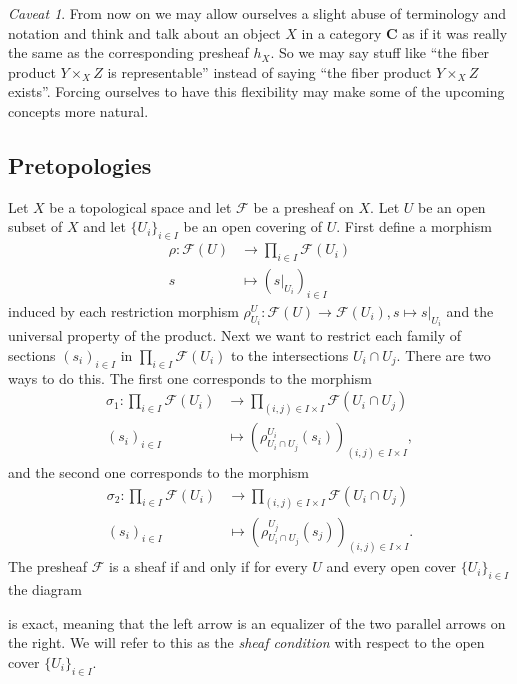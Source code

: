 \documentclass[12pt,reqno,a4paper]{amsart}
\theoremstyle{plain}
\theoremstyle{definition}
\theoremstyle{remark}
\newtheorem{cav}{Caveat}
\begin{document}
\begin{cav}
  From now on we may allow ourselves a slight abuse of terminology and notation and think and talk about an object $X$ in a category $\mathbf{C}$ as if it was really the same as the corresponding presheaf $h_{X}$.
  So we may say stuff like ``the fiber product $Y \times_{X} Z$ is representable'' instead of saying ``the fiber product $Y \times_{X} Z$ exists''.
  Forcing ourselves to have this flexibility may make some of the upcoming concepts more natural.
\end{cav}

\subsection{Pretopologies}

Let $X$ be a topological space and let $\mathscr{F}$ be a presheaf on $X$.
Let $U$ be an open subset of $X$ and let $\{U_{i}\}_{i \in I}$ be an open covering of $U$.
First define a morphism
\begin{align*}
  \rho \colon \mathscr{F}(U) & \to \prod_{i \in I} \mathscr{F}(U_{i}) \\
  s & \mapsto (s|_{U_{i}})_{i \in I}
\end{align*}
induced by each restriction morphism $\rho^{U}_{U_{i}} \colon \mathscr{F}(U) \to \mathscr{F}(U_{i}), s \mapsto s|_{U_{i}}$ and the universal property of the product.
Next we want to restrict each family of sections $(s_{i})_{i \in I}$ in $\prod_{i \in I} \mathscr{F}(U_{i})$ to the intersections $U_{i} \cap U_{j}$.
There are two ways to do this.
The first one corresponds to the morphism
\begin{align*}
  \sigma_{1} \colon \prod_{i \in I} \mathscr{F}(U_{i}) & \to \prod_{(i, j) \in I \times I} \mathscr{F}(U_{i} \cap U_{j}) \\
  (s_{i})_{i \in I} & \mapsto \left(\rho^{U_{i}}_{U_{i} \cap U_{j}}(s_{i})\right)_{(i, j) \in I \times I},
\end{align*}
and the second one corresponds to the morphism
\begin{align*}
  \sigma_{2} \colon \prod_{i \in I} \mathscr{F}(U_{i}) & \to \prod_{(i, j) \in I \times I} \mathscr{F}(U_{i} \cap U_{j}) \\
  (s_{i})_{i \in I} & \mapsto \left(\rho^{U_{j}}_{U_{i} \cap U_{j}}(s_{j})\right)_{(i, j) \in I \times I}.
\end{align*}
The presheaf $\mathscr{F}$ is a sheaf if and only if for every $U$ and every open cover $\{U_{i}\}_{i \in I}$ the diagram
\begin{center}
\end{center}
is exact, meaning that the left arrow is an equalizer of the two parallel arrows on the right.
We will refer to this as the \textit{sheaf condition} with respect to the open cover $\{ U_{i} \}_{i \in I}$.
\end{document}
